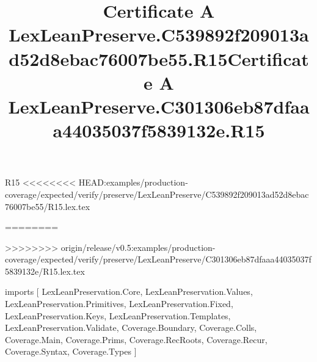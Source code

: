 \begin{lexlean}{R15}
<<<<<<<< HEAD:examples/production-coverage/expected/verify/preserve/LexLeanPreserve/C539892f209013ad52d8ebac76007be55/R15.lex.tex
\title{Certificate A LexLeanPreserve.C539892f209013ad52d8ebac76007be55.R15}
========
\title{Certificate A LexLeanPreserve.C301306eb87dfaaa44035037f5839132e.R15}
>>>>>>>> origin/release/v0.5:examples/production-coverage/expected/verify/preserve/LexLeanPreserve/C301306eb87dfaaa44035037f5839132e/R15.lex.tex
\begin{coremodule}
imports [
  LexLeanPreservation.Core,
  LexLeanPreservation.Values,
  LexLeanPreservation.Primitives,
  LexLeanPreservation.Fixed,
  LexLeanPreservation.Keys,
  LexLeanPreservation.Templates,
  LexLeanPreservation.Validate,
  Coverage.Boundary,
  Coverage.Colls,
  Coverage.Main,
  Coverage.Prims,
  Coverage.RecRoots,
  Coverage.Recur,
  Coverage.Syntax,
  Coverage.Types
]


\end{coremodule}
\end{lexlean}
